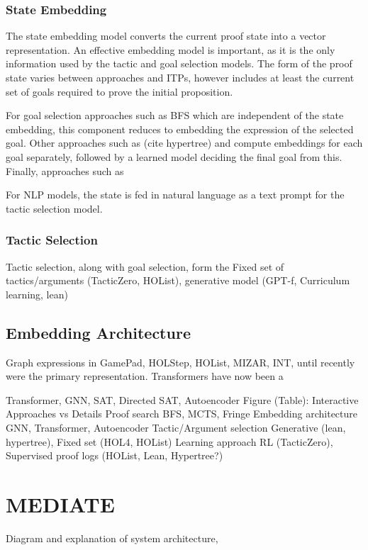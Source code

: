 \documentclass[letterpaper]{article} %
\begin{document}
    \subsubsection{State Embedding}
    The state embedding model converts the current proof state into a vector representation.
    An effective embedding model is important, as it is the only information used by the tactic and goal selection models.
    The form of the proof state varies between approaches and ITPs,
    however includes at least the current set of goals required to prove the initial proposition.

    For goal selection approaches such as BFS which are independent of the state embedding,
    this component reduces to embedding the expression of the selected goal.
    Other approaches such as (cite hypertree) and \cite{wu_tacticzero_2021} compute embeddings for each goal separately,
    followed by a learned model deciding the final goal from this.
    Finally, approaches such as


    For NLP models, the state is fed in natural language as a text prompt for the tactic selection model.

    \subsubsection{Tactic Selection}
    Tactic selection, along with goal selection, form the
    Fixed set of tactics/arguments (TacticZero, HOList), generative model (GPT-f, Curriculum learning, lean)

    \subsection{Embedding Architecture}

    Graph expressions in GamePad, HOLStep, HOList, MIZAR, INT, until recently were the primary representation.
    Transformers have now been a

    Transformer, GNN, SAT, Directed SAT, Autoencoder
    Figure (Table):
    Interactive Approaches vs Details
    Proof search
    BFS, MCTS, Fringe
    Embedding architecture
    GNN, Transformer, Autoencoder
    Tactic/Argument selection
    Generative (lean, hypertree), Fixed set (HOL4, HOList)
    Learning approach
    RL (TacticZero), Supervised proof logs (HOList, Lean, Hypertree?)


    \section{MEDIATE}
    Diagram and explanation of system architecture,
\end{document}
